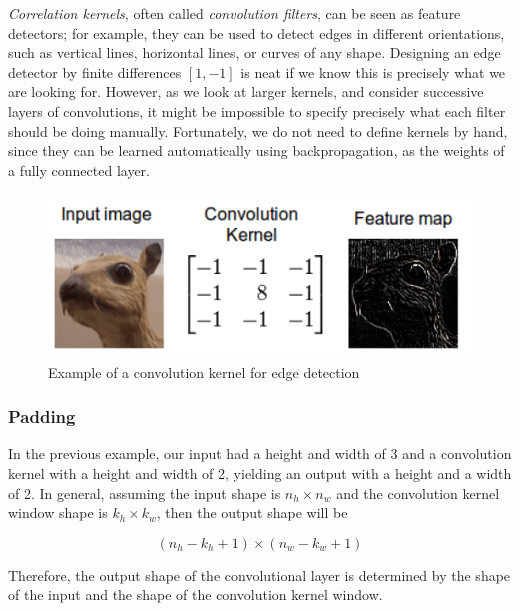 \textit{Correlation kernels}, often called \textit{convolution filters}, can be seen as feature detectors; for example, they can be used to detect edges in different orientations, such as vertical lines, horizontal lines, or curves of any shape. Designing an edge detector by finite differences $[1, -1]$ is neat if we know this is precisely what we are looking for. However, as we look at larger kernels, and consider successive layers of convolutions, it might be impossible to specify precisely what each filter should be doing manually. Fortunately, we do not need to define kernels by hand, since they can be learned automatically using backpropagation, as the weights of a fully connected layer.

\begin{figure}[hpt]
	\centering
	\includegraphics[scale=0.7]{images/ch3/edge-detection.png}
	\caption{Example of a convolution kernel for edge detection}
	\label{fig:edge-detection}
\end{figure}

\subsubsection{Padding}

In the previous example, our input had a height and width of 3 and a convolution kernel with a height and width of 2, yielding an output with a height and a width of 2. In general, assuming the input shape is  $n_h \times n_w$  and the convolution kernel window shape is $k_h \times k_w$, then the output shape will be

$$(n_h-k_h+1) \times (n_w-k_w+1)$$
 
Therefore, the output shape of the convolutional layer is determined by the shape of the input and the shape of the convolution kernel window.

